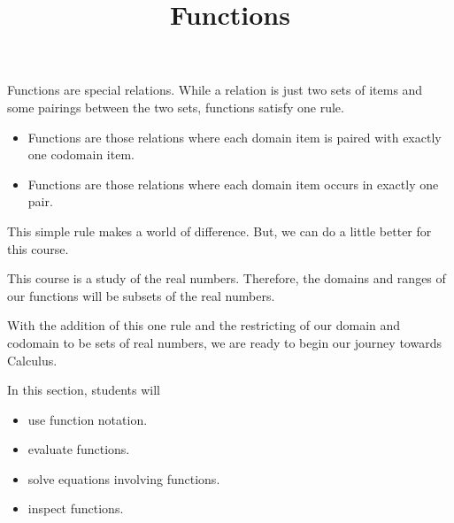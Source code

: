 \documentclass{ximera}
\title{Functions}
\begin{document}
\begin{abstract}
\end{abstract}
\maketitle




Functions are special relations. While a relation is just two sets of items and some pairings between the two sets, functions satisfy one rule. 

\begin{itemize}
\item Functions are those relations where each domain item is paired with exactly one codomain item.
\item Functions are those relations where each domain item occurs in exactly one pair.
\end{itemize}


This simple rule makes a world of difference. But, we can do a little better for this course.

This course is a study of the real numbers.  Therefore, the domains and ranges of our functions will be subsets of the real numbers.


With the addition of this one rule and the restricting of our domain and codomain to be sets of real numbers, we are ready to begin our journey towards Calculus.











\begin{sectionOutcomes}
In this section, students will 

\begin{itemize}
\item use function notation.
\item evaluate functions.
\item solve equations involving functions.
\item inspect functions.
\end{itemize}
\end{sectionOutcomes}
\end{document}
